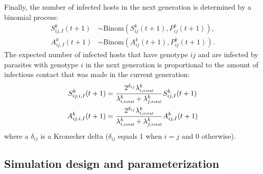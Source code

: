 \documentclass{article}\usepackage[]{graphicx}\usepackage[]{color}
\begin{document}
Finally, the number of infected hosts in the next generation is determined by a binomial process:
\begin{equation}
\begin{aligned}
S_{ij,I}^k (t+1) &\sim \mathrm{Binom}\left(S_{ij}^k (t+1), P_{ij}^k(t+1)\right),\\
A_{ij,I}^k (t+1) &\sim \mathrm{Binom}\left(A_{ij}^k (t+1), P_{ij}^k(t+1)\right).
\end{aligned}
\end{equation}
The expected number of infected hosts that have genotype $ij$ and are infected by parasites with genotype $i$ in the next generation is proportional to the amount of infectious contact that was made in the current generation:
\begin{equation}
\begin{aligned}
S_{ij,i,I}^k(t+1) &=  \frac{2^{\delta_{ij}} \lambda_{i, \textrm{\tiny total}}^k}{\lambda_{i, \textrm{\tiny total}}^k + \lambda_{j, \textrm{\tiny total}}^k} S_{ij,I}^k(t+1)\\
A_{ij,i,I}^k(t+1) &=  \frac{2^{\delta_{ij}} \lambda_{i, \textrm{\tiny total}}^k}{\lambda_{i, \textrm{\tiny total}}^k + \lambda_{j, \textrm{\tiny total}}^k} A_{ij,I}^k(t+1)
\end{aligned}
\end{equation}
where a $\delta_{ij}$ is a Kronecker delta ($\delta_{ij}$ equals 1 when $i = j$ and 0 otherwise).

\subsection{Simulation design and parameterization}
\end{document}
